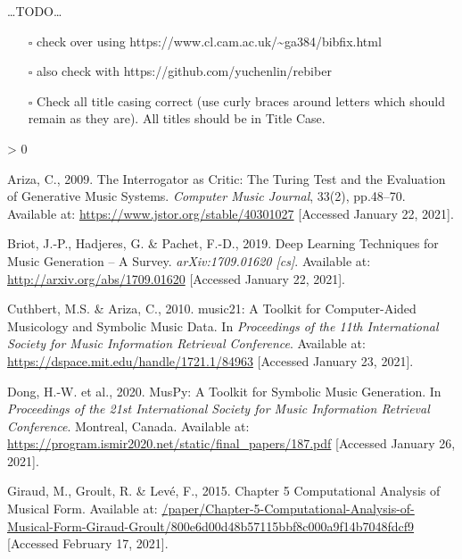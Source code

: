 \documentclass[12pt,a4paper,]{report}
\providecommand{\tightlist}{%
  \setlength{\itemsep}{0pt}\setlength{\parskip}{0pt}}
\newlength{\cslhangindent}
\newenvironment{CSLReferences}[2] %
 {%
  \setlength{\parindent}{0pt}
  \ifodd #1 \everypar{\setlength{\hangindent}{\cslhangindent}}\ignorespaces\fi
  \ifnum #2 > 0
  \setlength{\parskip}{#2\baselineskip}
  \fi
 }%
 {}
\begin{document}
\ldots TODO\ldots{}

\begin{itemize}
\tightlist
\item[$\square$]
  check over using
  https://www.cl.cam.ac.uk/\textasciitilde ga384/bibfix.html
\item[$\square$]
  also check with https://github.com/yuchenlin/rebiber
\item[$\square$]
  Check all title casing correct (use curly braces around letters which
  should remain as they are). All titles should be in Title Case.
\end{itemize}

\hypertarget{refs}{}
\begin{CSLReferences}{1}{0}
\leavevmode\hypertarget{ref-ariza_interrogator_2009}{}%
Ariza, C., 2009. The {Interrogator} as {Critic}: {The} {Turing} {Test}
and the {Evaluation} of {Generative} {Music} {Systems}. \emph{Computer
Music Journal}, 33(2), pp.48--70. Available at:
\url{https://www.jstor.org/stable/40301027} {[}Accessed January 22,
2021{]}.

\leavevmode\hypertarget{ref-briot_deep_2019}{}%
Briot, J.-P., Hadjeres, G. \& Pachet, F.-D., 2019. Deep {Learning}
{Techniques} for {Music} {Generation} -- {A} {Survey}.
\emph{arXiv:1709.01620 {[}cs{]}}. Available at:
\url{http://arxiv.org/abs/1709.01620} {[}Accessed January 22, 2021{]}.

\leavevmode\hypertarget{ref-cuthbert_music21_2010}{}%
Cuthbert, M.S. \& Ariza, C., 2010. music21: {A} {Toolkit} for
{Computer}-{Aided} {Musicology} and {Symbolic} {Music} {Data}. In
\emph{Proceedings of the 11th {International} {Society} for {Music}
{Information} {Retrieval} {Conference}}. Available at:
\url{https://dspace.mit.edu/handle/1721.1/84963} {[}Accessed January 23,
2021{]}.

\leavevmode\hypertarget{ref-dong_muspy_2020}{}%
Dong, H.-W. et al., 2020. {MusPy}: {A} {Toolkit} for {Symbolic} {Music}
{Generation}. In \emph{Proceedings of the 21st {International} {Society}
for {Music} {Information} {Retrieval} {Conference}}. Montreal, Canada.
Available at:
\url{https://program.ismir2020.net/static/final_papers/187.pdf}
{[}Accessed January 26, 2021{]}.

\leavevmode\hypertarget{ref-giraud_chapter_2015}{}%
Giraud, M., Groult, R. \& Levé, F., 2015. Chapter 5 {Computational}
{Analysis} of {Musical} {Form}. Available at:
\href{https:///paper/Chapter-5-Computational-Analysis-of-Musical-Form-Giraud-Groult/800e6d00d48b57115bbf8c000a9f14b7048fdcf9}{/paper/Chapter-5-Computational-Analysis-of-Musical-Form-Giraud-Groult/800e6d00d48b57115bbf8c000a9f14b7048fdcf9}
{[}Accessed February 17, 2021{]}.


\end{CSLReferences}
\end{document}
